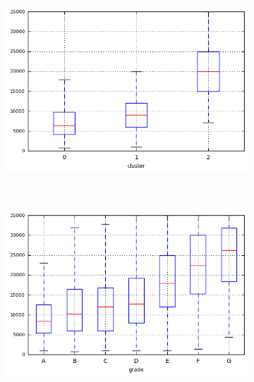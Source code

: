 \begin{anexosenv}
\begin{figure}[ht!]
\begin{subfigure}[t]{0.45\textwidth}
        \end{subfigure}
\end{figure}

\begin{figure}[t!]
    \centering
        \caption{\emph{Boxplots} de funded\textunderscore amnt\textunderscore inv }
        \begin{subfigure}[t]{0.45\textwidth}
 
            \centerline{\includegraphics[width=1\textwidth]{img/funded_amnt_inv_by_cluster}}
        \end{subfigure}%
        ~ 
        \begin{subfigure}[t]{0.45\textwidth}
            \centerline{\includegraphics[width=1\textwidth]{img/funded_amnt_inv_by_grade}}


\end{subfigure}
\end{figure}
\end{anexosenv}
